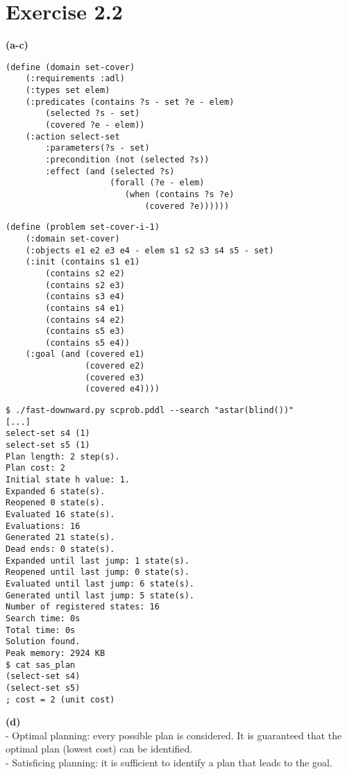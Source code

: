 \documentclass[11pt,a4paper]{article}
\begin{document}
\section*{Exercise 2.2}
\textbf{(a-c)}
\begin{lstlisting}[frame=single,basicstyle=\ttfamily\footnotesize,caption={set cover problem as a PDDL domain}]
(define (domain set-cover)
    (:requirements :adl)
    (:types set elem)
    (:predicates (contains ?s - set ?e - elem)
        (selected ?s - set)
        (covered ?e - elem))
    (:action select-set
        :parameters(?s - set)
        :precondition (not (selected ?s))
        :effect (and (selected ?s)
                     (forall (?e - elem)
                        (when (contains ?s ?e)
                            (covered ?e))))))
\end{lstlisting}
\begin{lstlisting}[frame=single,basicstyle=\ttfamily\footnotesize,caption={set cover instance as a PDDL problem}]
(define (problem set-cover-i-1)
    (:domain set-cover)
    (:objects e1 e2 e3 e4 - elem s1 s2 s3 s4 s5 - set)
    (:init (contains s1 e1)
        (contains s2 e2)
        (contains s2 e3)
        (contains s3 e4)
        (contains s4 e1)
        (contains s4 e2)
        (contains s5 e3)
        (contains s5 e4))
    (:goal (and (covered e1)
                (covered e2)
                (covered e3)
                (covered e4))))
\end{lstlisting}
\begin{lstlisting}[frame=single,basicstyle=\ttfamily\footnotesize,caption={solving set cover instance with fast-downward}]
$ ./fast-downward.py scprob.pddl --search "astar(blind())"
[...]
select-set s4 (1)
select-set s5 (1)
Plan length: 2 step(s).
Plan cost: 2
Initial state h value: 1.
Expanded 6 state(s).
Reopened 0 state(s).
Evaluated 16 state(s).
Evaluations: 16
Generated 21 state(s).
Dead ends: 0 state(s).
Expanded until last jump: 1 state(s).
Reopened until last jump: 0 state(s).
Evaluated until last jump: 6 state(s).
Generated until last jump: 5 state(s).
Number of registered states: 16
Search time: 0s
Total time: 0s
Solution found.
Peak memory: 2924 KB
$ cat sas_plan
(select-set s4)
(select-set s5)
; cost = 2 (unit cost)
\end{lstlisting}
\textbf{(d)}\\
- Optimal planning: every possible plan is considered. It is guaranteed that the optimal plan (lowest cost) can be identified.\\
- Satisficing planning: it is sufficient to identify a plan that leads to the goal.\\
\end{document}

